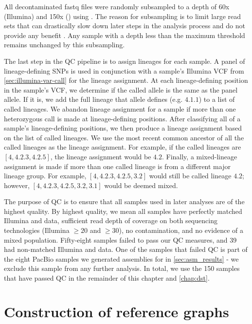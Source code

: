 All decontaminated fastq files were randomly subsampled to a depth of 60x (Illumina) and 150x (\ont{}) using  \cite{rasusa2019}. The reason for subsampling is to limit large read sets that can drastically slow down later steps in the analysis process and do not provide any benefit \cite{demaio2019}. Any sample with a depth less than the maximum threshold remains unchanged by this subsampling.  

The last step in the QC pipeline is to assign lineages for each sample. A panel of lineage-defining SNPs \cite{Shitikov2017,Rutaihwa2019,stucki2016} is used in conjunction with a sample's Illumina VCF from \autoref{sec:illumina-var-call} for the lineage assignment. At each lineage-defining position in the sample's VCF, we determine if the called allele is the same as the panel allele. If it is, we add the full lineage that allele defines (e.g. $4.1.1$) to a list of called lineages. We abandon lineage assignment for a sample if more than one heterozygous call is made at lineage-defining positions. After classifying all of a sample's lineage-defining positions, we then produce a lineage assignment based on the list of called lineages. We use the most recent common ancestor of all the called lineages as the lineage assignment. For example, if the called lineages are $[4, 4.2.3, 4.2.5]$, the lineage assignment would be $4.2$. Finally, a mixed-lineage assignment is made if more than one called lineage is from a different major lineage group. For example, $[4, 4.2.3, 4.2.5, 3.2]$ would still be called lineage $4.2$; however, $[4, 4.2.3, 4.2.5, 3.2, 3.1]$ would be deemed mixed.

The purpose of QC is to ensure that all samples used in later analyses are of the highest quality. By highest quality, we mean all samples have perfectly matched Illumina and \ont{} data, sufficient read depth of coverage on both sequencing technologies (Illumina $\ge 20$ and \ont{} $\ge 30$), no contamination, and no evidence of a mixed \mtb{} population. Fifty-eight samples failed to pass our QC measures, and 39 had non-matched Illumina and \ont{} data. One of the samples that failed QC is part of the eight PacBio samples we generated assemblies for in \autoref{sec:asm_results} - we exclude this sample from any further analysis. In total, we use the 150 samples that have passed QC in the remainder of this chapter and \autoref{chap:dst}.


\section{Construction of \mtb{} reference graphs}
\label{sec:tbprg}

